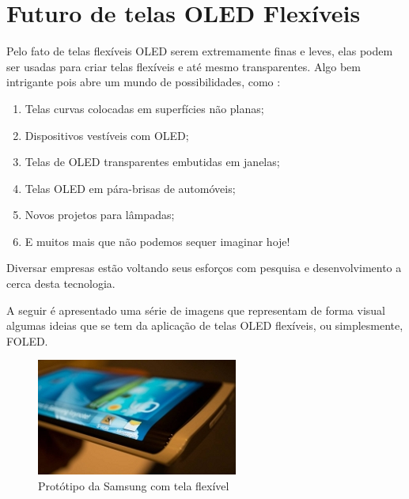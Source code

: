 \section{Futuro de telas OLED Flexíveis}
\label{sec:investimento}

Pelo fato de telas flexíveis OLED serem extremamente finas e leves, elas podem ser usadas ​​para criar telas flexíveis e até mesmo transparentes. Algo bem intrigante pois abre um mundo de possibilidades, como \cite{OIBOI}: 

\begin{enumerate}
    \item Telas curvas colocadas em superfícies não planas;
    \item Dispositivos vestíveis com OLED;
    \item Telas de OLED transparentes embutidas em janelas;
    \item Telas OLED em pára-brisas de automóveis;
    \item Novos projetos para lâmpadas;
    \item E muitos mais que não podemos sequer imaginar hoje!
\end{enumerate}

Diversar empresas estão voltando seus esforços com pesquisa e desenvolvimento a cerca desta tecnologia. 

A seguir é apresentado uma série de imagens que representam de forma visual algumas ideias que se tem da aplicação de telas OLED flexíveis, ou simplesmente, FOLED.

\begin{figure}[!h]
  \centering
  \includegraphics[width=.40\textwidth]{./figuras/oled-samsung-device} 
  \caption{Protótipo da Samsung com tela flexível}
  \label{fig:oled-samsung-device} 
\end{figure}
